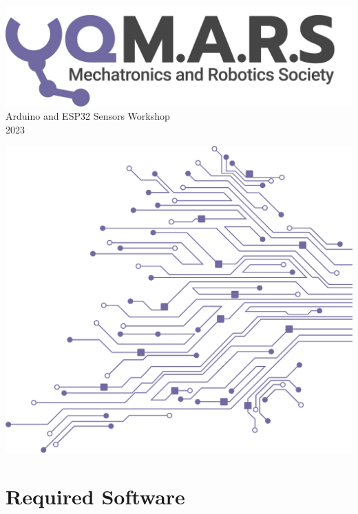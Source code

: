 \documentclass[a4paper,12pt]{report}
\begin{document}
\begin{titlepage}
    \begin{center}
        \vspace*{15mm}
        \includegraphics[width=0.7\paperwidth]{Assets/Logo (Dark).png} \\
        \vspace{1cm}
        \Huge Arduino and ESP32 Sensors Workshop \\
        \huge \textcolor{turbo_purple}{2023}
    \end{center}
    \vfill
    \includegraphics[height=0.5\paperheight, right]{Assets/Pattern - PCB (Solid).png}
    \vspace*{10mm}
\end{titlepage}
\restoregeometry

\section*{Required Software}

\newpage
\end{document}
